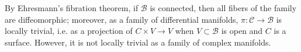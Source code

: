 \documentclass[11pt,b5paper,notitlepage]{article}
\theoremstyle{definition}
\theoremstyle{plain}
\newcommand{\mc}{\mathcal}
\numberwithin{equation}{section}
\begin{document}
By Ehresmann's fibration theorem, if $\mc B$ is connected, then all fibers of the family are diffeomorphic; moreover,  as a family of differential manifolds, $\pi:\mc C\rightarrow\mc B$ is locally trivial, i.e. as a projection of $C\times V\rightarrow V$ when $V\subset \mc B$ is open and $C$ is a surface. However, it is not locally trivial as a family of complex manifolds.                                                                                                                                                                                                                                                                                                                                                                                                                                                                                                                                                                                                                                                                                                                                                                                                                                                                                                                                                                                                                                                                                                                                                              
\end{document}
